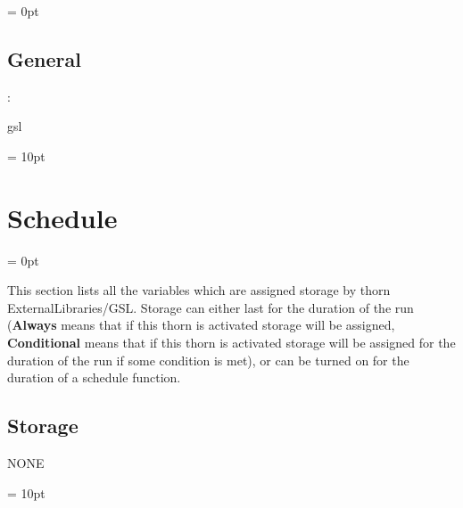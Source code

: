 \parskip = 0pt

\vspace{3mm} \subsection*{General}

: 

gsl
\vspace{2mm}

\vspace{5mm}\parskip = 10pt 

\section{Schedule} 


\parskip = 0pt


\noindent This section lists all the variables which are assigned storage by thorn ExternalLibraries/GSL.  Storage can either last for the duration of the run ({\bf Always} means that if this thorn is activated storage will be assigned, {\bf Conditional} means that if this thorn is activated storage will be assigned for the duration of the run if some condition is met), or can be turned on for the duration of a schedule function.


\subsection*{Storage}NONE

\vspace{5mm}\parskip = 10pt 

